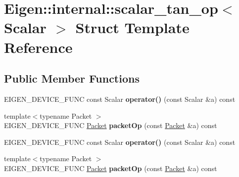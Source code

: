 \hypertarget{struct_eigen_1_1internal_1_1scalar__tan__op}{}\section{Eigen\+:\+:internal\+:\+:scalar\+\_\+tan\+\_\+op$<$ Scalar $>$ Struct Template Reference}
\label{struct_eigen_1_1internal_1_1scalar__tan__op}
\subsection*{Public Member Functions}
\begin{DoxyCompactItemize}
\item 
\mbox{\label{struct_eigen_1_1internal_1_1scalar__tan__op_a9508b4ec252b7727df8f269e012fe779}} 
E\+I\+G\+E\+N\+\_\+\+D\+E\+V\+I\+C\+E\+\_\+\+F\+U\+NC const Scalar {\bfseries operator()} (const Scalar \&a) const
\item 
\mbox{\label{struct_eigen_1_1internal_1_1scalar__tan__op_a94f05f71b29802eb1f0c4f5af2d50e67}} 
{\footnotesize template$<$typename Packet $>$ }\\E\+I\+G\+E\+N\+\_\+\+D\+E\+V\+I\+C\+E\+\_\+\+F\+U\+NC \hyperlink{union_eigen_1_1internal_1_1_packet}{Packet} {\bfseries packet\+Op} (const \hyperlink{union_eigen_1_1internal_1_1_packet}{Packet} \&a) const
\item 
\mbox{\label{struct_eigen_1_1internal_1_1scalar__tan__op_a9508b4ec252b7727df8f269e012fe779}} 
E\+I\+G\+E\+N\+\_\+\+D\+E\+V\+I\+C\+E\+\_\+\+F\+U\+NC const Scalar {\bfseries operator()} (const Scalar \&a) const
\item 
\mbox{\label{struct_eigen_1_1internal_1_1scalar__tan__op_a94f05f71b29802eb1f0c4f5af2d50e67}} 
{\footnotesize template$<$typename Packet $>$ }\\E\+I\+G\+E\+N\+\_\+\+D\+E\+V\+I\+C\+E\+\_\+\+F\+U\+NC \hyperlink{union_eigen_1_1internal_1_1_packet}{Packet} {\bfseries packet\+Op} (const \hyperlink{union_eigen_1_1internal_1_1_packet}{Packet} \&a) const
\end{DoxyCompactItemize}


